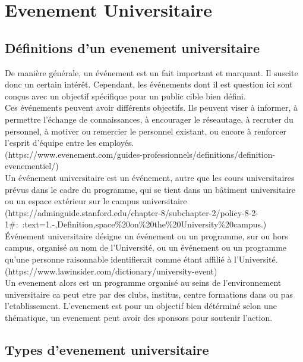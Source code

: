 \documentclass[12pt]{report}
\begin{document}
\section{Evenement Universitaire}

\subsection{Définitions d'un evenement universitaire}


De manière générale, un événement est un fait important et marquant. Il suscite donc un certain intérêt. Cependant, les événements dont il est question ici sont conçus avec un objectif spécifique pour un public cible bien défini.
\\Ces événements peuvent avoir différents objectifs. Ils peuvent viser à informer, à permettre l’échange de connaissances, à encourager le réseautage, à recruter du personnel, à motiver ou remercier le personnel existant, ou encore à renforcer l’esprit d’équipe entre les employés. \\ (https://www.evenement.com/guides-professionnels/definitions/definition-evenementiel/)\\


Un événement universitaire est un événement, autre que les cours universitaires prévus dans le cadre du programme, qui se tient dans un bâtiment universitaire ou un espace extérieur sur le campus universitaire
\\ (https://adminguide.stanford.edu/chapter-8/subchapter-2/policy-8-2-1\#:~:text=1.-,Definition,space\%20on\%20the\%20University\%20campus.)\\


Événement universitaire désigne un événement ou un programme, sur ou hors campus, organisé au nom de l'Université, ou un événement ou un programme qu'une personne raisonnable identifierait comme étant affilié à l'Université.
\\ (https://www.lawinsider.com/dictionary/university-event)\\


Un evenement alors est un programme organisé au seins de l'environnement universitaire ca peut etre par des clubs, institus, centre formations dans ou pas l'etablissement. L'evenement est pour un objectif bien détérminé selon une thématique, un evenement peut avoir des sponsors pour soutenir l'action.
\subsection{Types d'evenement universitaire}
\end{document}
